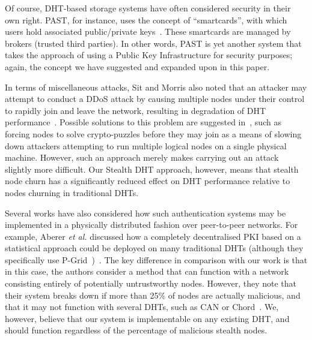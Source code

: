 \documentclass[times, 10pt,twocolumn]{article}
\begin{document}
Of course, DHT-based storage systems have often considered security in
their own right. PAST, for instance, uses the concept of
``smartcards'', with which users hold associated public/private
keys~\cite{Druschel01PAST}. These smartcards are managed by brokers
(trusted third parties). In other words, PAST is yet another system
that takes the approach of using a Public Key Infrastructure for
security purposes; again, the concept we have suggested and expanded
upon in this paper.

In terms of miscellaneous attacks, Sit and Morris also noted that an
attacker may attempt to conduct a DDoS attack by causing multiple nodes
under their control to rapidly join and leave the network, resulting in
degradation of DHT
performance~\cite{Rhea04Handling}\cite{Li04Comparing}. Possible
solutions to this problem are suggested in~\cite{Castro02Secure}, such
as forcing nodes to solve crypto-puzzles before they may join as a
means of slowing down attackers attempting to run multiple logical
nodes on a single physical machine. However, such an approach merely
makes carrying out an attack slightly more difficult. Our Stealth DHT
approach, however, means that stealth node churn has a significantly
reduced effect on DHT performance relative to nodes churning in
traditional DHTs.

Several works have also considered how such authentication systems may
be implemented in a physically distributed fashion over peer-to-peer
networks. For example, Aberer \emph{et al.} discussed how a completely
decentralised PKI based on a statistical approach could be deployed on
many traditional DHTs (although they specifically use
P-Grid~\cite{Plaxton97Accessing})~\cite{Aberer04Decentralized}. The key
difference in comparison with our work is that in this case, the
authors consider a method that can function with a network consisting
entirely of potentially untrustworthy nodes. However, they note that
their system breaks down if more than 25\% of nodes are actually
malicious, and that it may not function with several DHTs, such as CAN
or Chord~\cite{Ratnasamy01Scalable}\cite{Stoica01Chord}. We, however,
believe that our system is implementable on any existing DHT, and
should function regardless of the percentage of malicious stealth
nodes.

\label{sect-conclusion}
\end{document}
